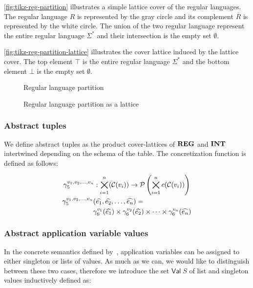     \autoref{fig:tikz-reg-partition} illustrates a simple lattice cover of the regular languages.
    The regular language $R$ is represented by the gray circle and its complement $\overline{R}$ is represented by the white circle.
    The union of the two regular language represent the entire regular language $\Sigma^*$ and their intersection is the empty set $\emptyset$.

    \autoref{fig:tikz-reg-partition-lattice} illustrates the cover lattice induced by the lattice cover.
    The top element $\top$ is the entire regular language $\Sigma^*$ and the bottom element $\bot$ is the empty set $\emptyset$.


\begin{figure}
    \center
    
    \caption{Regular language partition}
    \label{fig:tikz-reg-partition}
\end{figure}

\begin{figure}[!htb]
    \center
    
    \caption{Regular language partition as a lattice}
    \label{fig:tikz-reg-partition-lattice}
\end{figure}

\subsubsection{Abstract tuples}\label{subsubsec:abstract-tuples}

We define abstract tuples as the product cover-lattices of $\mathbf{REG}$ and $\mathbf{INT}$ intertwined depending on the schema of the table.
The concretization function is defined as follows:


\begin{gather}
    \gamma^{v_1, v_2, \dots, v_n}_5 : \bigtimes_{i = 1}^{n}(\mathcal{C}(v_i)) \rightarrow \mathcal{P}\left(\bigtimes_{i = 1}^n c(\mathcal{C}(v_i)) \right)\\
    \begin{split}
        \gamma^{v_1, v_2, \dots, v_n}_5 & (\widehat{e_1}, \widehat{e_2}, \dots, \widehat{e_n}) = \\
         &\gamma^{v_1}_6(\widehat{e_1}) \times \gamma^{v_2}_6(\widehat{e_2}) \times \dots \times \gamma^{v_n}_6(\widehat{e_n})
    \end{split}
\end{gather}

\subsubsection{Abstract application variable values}
In the concrete semantics defined by~\cite{halder_abstract_2012}, application variables can be assigned to either singleton or lists of values.
As much as we can, we would like to distinguish between these two cases, therefore we introduce the set $\mathsf{Val} \; S$ of list and singleton values inductively defined as:


